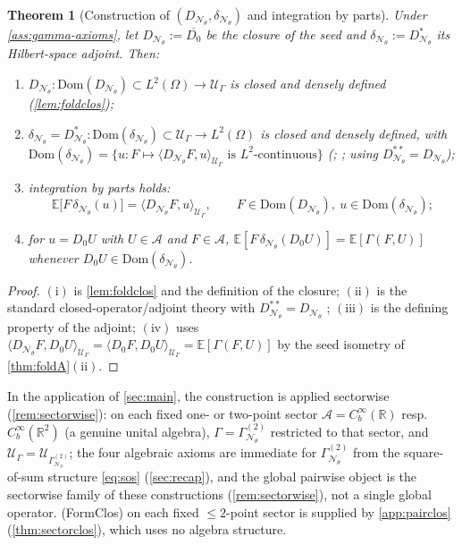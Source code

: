 \documentclass[reqno,final,11pt]{amsart}
\theoremstyle{plain}
\newtheorem{theorem}{Theorem}[section]
\theoremstyle{definition}
\theoremstyle{remark}
\newcommand{\R}{\mathbb R}
\newcommand{\E}{\mathbb E}
\newcommand{\Dom}{\mathrm{Dom}}
\newcommand{\cA}{\mathcal A}
\newcommand{\cN}{\mathcal N}
\newcommand{\cU}{\mathcal U}
\newcommand{\GamN}{\Gamma^{(2)}_{\cN_\theta}}
\newcommand{\DN}{D_{\cN_\theta}}
\newcommand{\divN}{\delta_{\cN_\theta}}
\begin{document}
\begin{theorem}[Construction of $(\DN,\divN)$ and integration by parts]\label{thm:foldB}
Under \cref{ass:gamma-axioms}, let $\DN:=\overline{D_0}$ be the closure of the
seed and $\divN:=\DN^{*}$ its Hilbert-space adjoint. Then:
\begin{enumerate}
\item[$(\mathrm i)$] $\DN\colon\Dom(\DN)\subset L^2(\Omega)\to\cU_\Gamma$ is
closed and densely defined (\cref{lem:foldclos});
\item[$(\mathrm{ii})$] $\divN=\DN^{*}\colon\Dom(\divN)\subset\cU_\Gamma\to
L^2(\Omega)$ is closed and densely defined, with
$\Dom(\divN)=\{u:F\mapsto\langle\DN F,u\rangle_{\cU_\Gamma}\text{ is }L^2\text{-continuous}\}$
(\citealp[Thm.~13.9]{Rudin-FA}; \citealp[Ch.~5]{Schmuedgen}; using $\DN^{**}=\DN$);
\item[$(\mathrm{iii})$] integration by parts holds:
\begin{equation}\label{eq:foldIBP}
  \E\bigl[F\,\divN(u)\bigr]=\langle\DN F,u\rangle_{\cU_\Gamma},
  \qquad F\in\Dom(\DN),\ u\in\Dom(\divN);
\end{equation}
\item[$(\mathrm{iv})$] for $u=D_0U$ with $U\in\cA$ and $F\in\cA$,
$\E[F\,\divN(D_0U)]=\E[\Gamma(F,U)]$ whenever $D_0U\in\Dom(\divN)$.
\end{enumerate}
\end{theorem}
\begin{proof}
$(\mathrm i)$ is \cref{lem:foldclos} and the definition of the closure;
$(\mathrm{ii})$ is the standard closed-operator/adjoint theory
\citep[Thm.~13.9]{Rudin-FA} with $\DN^{**}=\DN$ \citep[Ch.~5]{Schmuedgen};
$(\mathrm{iii})$ is the defining property of the adjoint; $(\mathrm{iv})$ uses
$\langle\DN F,D_0U\rangle_{\cU_\Gamma}=\langle D_0F,D_0U\rangle_{\cU_\Gamma}
=\E[\Gamma(F,U)]$ by the seed isometry of \cref{thm:foldA}$(\mathrm{ii})$.
\end{proof}

In the application of \cref{sec:main}, the construction is applied
sectorwise (\cref{rem:sectorwise}): on each fixed one- or two-point sector
$\cA=C_b^\infty(\R)$ resp.\ $C_b^\infty(\R^2)$ (a genuine unital algebra),
$\Gamma=\GamN$ restricted to that sector, and $\cU_\Gamma=\cU_{\GamN}$; the four
algebraic axioms are immediate for $\GamN$ from the square-of-sum structure
\eqref{eq:sos} (\cref{sec:recap}), and the global pairwise object is the
sectorwise family of these constructions (\cref{rem:sectorwise}), not a
single global operator. \textnormal{(FormClos)} on each fixed $\le2$-point sector
is supplied by \cref{app:pairclos} (\cref{thm:sectorclos}), which uses no algebra
structure.
\end{document}
